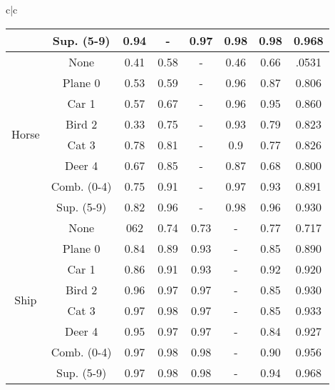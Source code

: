 \documentclass[acmtog, nonacm]{acmart}
\begin{document}
\begin{tabular}{c|c}
\begin{tabular}{@{}c|c|ccccc|c@{}}
                       & Sup. (5-9)                & 0.94 & -    & 0.97  & 0.98 & 0.98  & 0.968                \\
                       \midrule
\multirow{8}{*}{Horse} & None                      & 0.41 & 0.58 & -     & 0.46 & 0.66  & .0531                \\
                       & Plane 0                   & 0.53 & 0.59 & -     & 0.96 & 0.87  & 0.806                \\
                       & Car 1                     & 0.57 & 0.67 & -     & 0.96 & 0.95  & 0.860                \\
                       & Bird 2                    & 0.33 & 0.75 & -     & 0.93 & 0.79  & 0.823                \\
                       & Cat 3                     & 0.78 & 0.81 & -     & 0.9  & 0.77  & 0.826                \\
                       & Deer 4                    & 0.67 & 0.85 & -     & 0.87 & 0.68  & 0.800                \\
                       & Comb. (0-4)               & 0.75 & 0.91 & -     & 0.97 & 0.93  & 0.891                \\
                       & Sup. (5-9)                & 0.82 & 0.96 & -     & 0.98 & 0.96  & 0.930                \\
                       \midrule
\multirow{8}{*}{Ship}  & None                      & 062  & 0.74 & 0.73  & -    & 0.77  & 0.717                \\
                       & Plane 0                   & 0.84 & 0.89 & 0.93  & -    & 0.85  & 0.890                \\
                       & Car 1                     & 0.86 & 0.91 & 0.93  & -    & 0.92  & 0.920                \\
                       & Bird 2                    & 0.96 & 0.97 & 0.97  & -    & 0.85  & 0.930                \\
                       & Cat 3                     & 0.97 & 0.98 & 0.97  & -    & 0.85  & 0.933                \\
                       & Deer 4                    & 0.95 & 0.97 & 0.97  & -    & 0.84  & 0.927                \\
                       & Comb. (0-4)               & 0.97 & 0.98 & 0.98  & -    & 0.90  & 0.956                \\
                       & Sup. (5-9)                & 0.97 & 0.98 & 0.98  & -    & 0.94  & 0.968                \\

\end{tabular}
\end{tabular}
\end{document}
